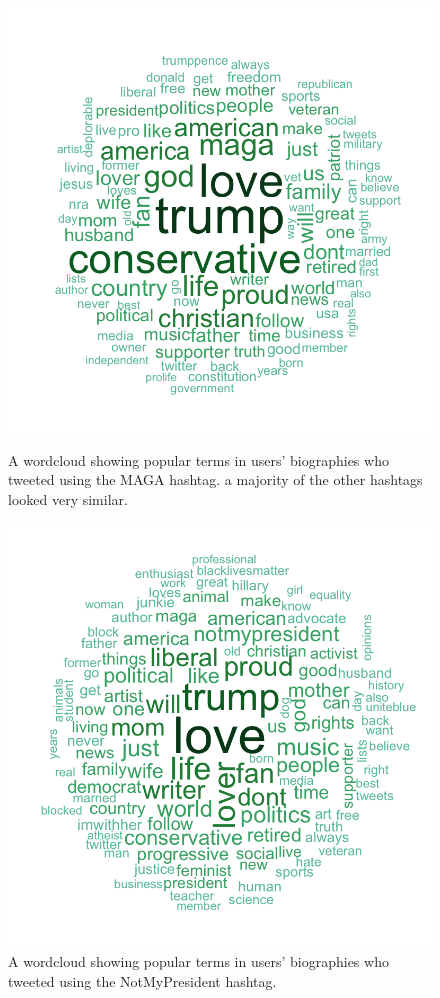 \documentclass[prodmode]{acmsmall} %
\begin{document}
\begin{figure}
\centering
\begin{minipage}[b]{.49\textwidth}
    \includegraphics[width = \textwidth]{cloud-maga}
\caption{A wordcloud showing popular terms in users' biographies who tweeted using
  the MAGA hashtag. a majority of the other hashtags looked very
  similar.}\label{maga cloud}
\end{minipage}\hfill
\begin{minipage}[b]{.49\textwidth}
    \includegraphics[width = \textwidth]{cloud-notmypresident}
\caption{A wordcloud showing popular terms in users' biographies who tweeted using
  the NotMyPresident hashtag.}\label{notmypresident cloud}
\end{minipage}
\end{figure}
\end{document}
